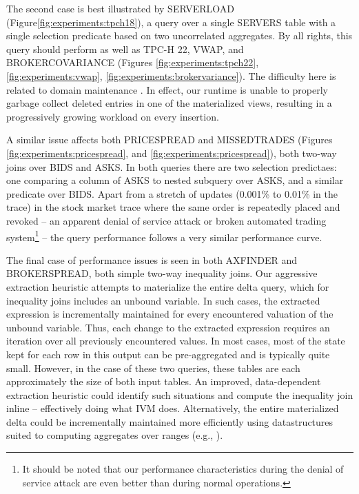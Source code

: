 The second case is best illustrated by SERVERLOAD (Figure\ref{fig:experiments:tpch18}), a query over a single SERVERS table with a single selection predicate based on two uncorrelated aggregates.  By all rights, this query should perform as well as TPC-H 22, VWAP, and BROKERCOVARIANCE (Figures \ref{fig:experiments:tpch22}, \ref{fig:experiments:vwap}, \ref{fig:experiments:brokervariance}).  The difficulty here is related to domain maintenance .  In effect, our runtime is unable to properly garbage collect deleted entries in one of the materialized views, resulting in a progressively growing workload on every insertion.  

A similar issue affects both PRICESPREAD and MISSEDTRADES (Figures \ref{fig:experiments:pricespread}, and \ref{fig:experiments:pricespread}), both two-way joins over BIDS and ASKS.  In both queries there are two selection predictaes: one comparing a column of ASKS to nested subquery over ASKS, and a similar predicate over BIDS.  Apart from a stretch of updates (0.001\% to 0.01\% in the trace) in the stock market trace where the same order is repeatedly placed and revoked -- an apparent denial of service attack or broken automated trading system\footnote{It should be noted that our performance characteristics during the denial of service attack are even better than during normal operations.} -- the query performance follows a very similar performance curve. 

The final case of performance issues is seen in both AXFINDER and BROKERSPREAD, both simple two-way inequality joins.  Our aggressive extraction heuristic attempts to materialize the entire delta query, which for inequality joins includes an unbound variable.  In such cases, the extracted expression is incrementally maintained for every encountered valuation of the unbound variable.  Thus, each change to the extracted expression requires an iteration over all previously encountered values.  In most cases, most of the state kept for each row in this output can be pre-aggregated and is typically quite small.  However, in the case of these two queries, these tables are each approximately the size of both input tables.  An improved, data-dependent extraction heuristic could identify such situations and compute the inequality join inline -- effectively doing what IVM does.  Alternatively, the entire materialized delta could be incrementally maintained more efficiently using datastructures suited to computing aggregates over ranges (e.g., \cite{range trees}).



